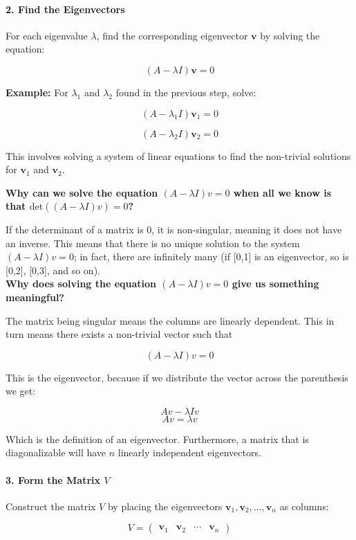 \documentclass[12pt]{article}
\begin{document}
\paragraph{2. Find the Eigenvectors}
For each eigenvalue \( \lambda \), find the corresponding eigenvector \( \mathbf{v} \) by solving the equation:

\[ (A - \lambda I) \mathbf{v} = 0 \]

\textbf{Example:} For \( \lambda_1 \) and \( \lambda_2 \) found in the previous step, solve:

\[ (A - \lambda_1 I) \mathbf{v}_1 = 0 \]

\[ (A - \lambda_2 I) \mathbf{v}_2 = 0 \]

This involves solving a system of linear equations to find the non-trivial solutions for \( \mathbf{v}_1 \) and \( \mathbf{v}_2 \).

\textbf{Why can we solve the equation \((A - \lambda I)v=0\) when all we know is that  \(\text{det}((A - \lambda I)v)=0\)?}

If the determinant of a matrix is 0, it is non-singular, meaning it does not have an inverse. This means that there is no unique solution to the system  \((A - \lambda I)v=0\); in fact, there are infinitely many (if [0,1] is an eigenvector, so is [0,2], [0,3], and so on). \\

\textbf{Why does solving the equation \((A - \lambda I)v=0\) give us something meaningful?}  

The matrix being singular means the columns are linearly dependent. This in turn means there exists a non-trivial vector such that

\[(A - \lambda I)v=0\]

This is the eigenvector, because if we distribute the vector across the parenthesis we get: 


\[Av - \lambda Iv\]
\[Av = \lambda v\]

Which is the definition of an eigenvector. Furthermore, a matrix that is diagonalizable will have \(n\) linearly independent eigenvectors.

\paragraph{3. Form the Matrix \( V \)}
Construct the matrix \( V \) by placing the eigenvectors \( \mathbf{v}_1, \mathbf{v}_2, \ldots, \mathbf{v}_n \) as columns:

\[ V = \begin{pmatrix} \mathbf{v}_1 & \mathbf{v}_2 & \cdots & \mathbf{v}_n \end{pmatrix} \]
\end{document}
